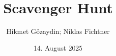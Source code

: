 \documentclass[oneside]{ausarbeitung}
\begin{document}


\Projektbericht

\Informatik

\title{Scavenger Hunt}

\author{Hikmet Gözaydin; Niklas Fichtner}

\examinerIsAProfessortrue   %


\date{14. August 2025}



\maketitle
\cleardoublepage

\setcounter{page}{1}


\makeaffirmation
\cleardoublepage

\makeconfidentialclause
\cleardoublepage
\end{document}
